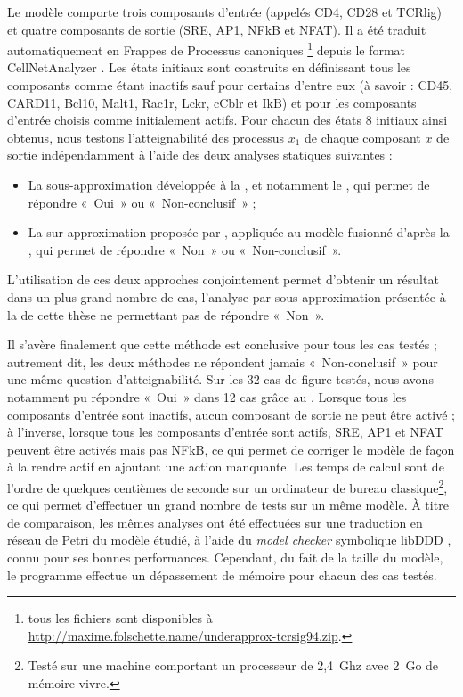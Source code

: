 Le modèle comporte trois composants d'entrée (appelés CD4, CD28 et TCRlig)
et quatre composants de sortie (SRE, AP1, NFkB et NFAT).
Il a été traduit automatiquement en Frappes de Processus canoniques%
\footnote{tous les fichiers sont disponibles à
\url{http://maxime.folschette.name/underapprox-tcrsig94.zip}.}
depuis le format CellNetAnalyzer \cite{klamt2007structural}.
Les états initiaux sont construits en définissant tous les composants
comme étant inactifs sauf pour certains d'entre eux
(à savoir : CD45, CARD11, Bcl10, Malt1, Rac1r, Lckr, cCblr et IkB)
et pour les composants d'entrée choisis comme initialement actifs.
Pour chacun des états 8 initiaux ainsi obtenus,
nous testons l'atteignabilité des processus $x_1$ de chaque composant $x$ de sortie
indépendamment à l'aide des deux analyses statiques suivantes :
\begin{itemize}
  \item La sous-approximation développée à la ,
    et notamment le ,
    qui permet de répondre «~Oui~» ou «~Non-conclusif~» ;
  \item La sur-approximation proposée par ,
    appliquée au modèle fusionné d'après la ,
    qui permet de répondre «~Non~» ou «~Non-conclusif~».
\end{itemize}
L'utilisation de ces deux approches conjointement permet d'obtenir un résultat dans un
plus grand nombre de cas,
l'analyse par sous-approximation présentée à la  de cette thèse
ne permettant pas de répondre «~Non~».

Il s'avère finalement que cette méthode est conclusive pour tous les cas testés ;
autrement dit, les deux méthodes ne répondent jamais «~Non-conclusif~»
pour une même question d'atteignabilité.
Sur les 32 cas de figure testés,
nous avons notamment pu répondre «~Oui~» dans 12 cas
grâce au .
Lorsque tous les composants d'entrée sont inactifs, aucun composant de sortie ne peut
être activé ;
à l'inverse, lorsque tous les composants d'entrée sont actifs,
SRE, AP1 et NFAT peuvent être activés mais pas NFkB,
ce qui permet de corriger le modèle de façon à la rendre actif en ajoutant une action manquante.
Les temps de calcul sont de l'ordre de quelques centièmes de seconde sur un ordinateur
de bureau classique\footnote{Testé sur une machine comportant
un processeur de 2,4~Ghz avec 2~Go de mémoire vivre.},
ce qui permet d'effectuer un grand nombre de tests sur un même modèle.
À titre de comparaison, les mêmes analyses ont été effectuées 
sur une traduction en réseau de Petri du modèle étudié,
à l'aide du \textit{model checker} symbolique libDDD \cite{Kordon09libddd},
connu pour ses bonnes performances.
Cependant, du fait de la taille du modèle, le programme effectue un dépassement de mémoire
pour chacun des cas testés.

